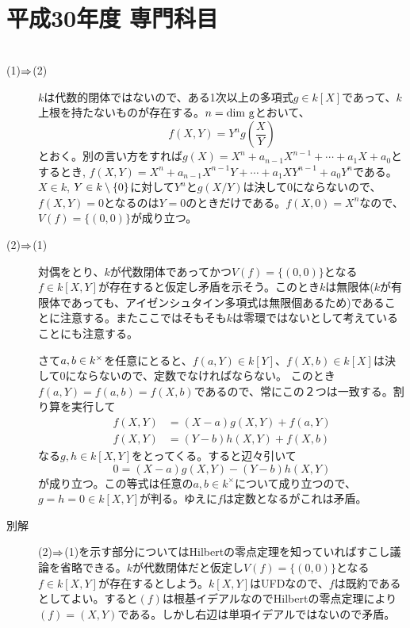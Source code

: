 \section{平成30年度 専門科目}

\subsubsection{} %
\begin{sol}${}$
\begin{description}
  \item[(1)$\Rightarrow$(2)] $k$は代数的閉体ではないので、ある1次以上の多項式$g \in k[X]$であって、$k$上根を持たないものが存在する。$n = \rm{dim}\ g$とおいて、
  \[
  f(X,Y)= Y^n g \left(\frac{X}{Y} \right)
  \]
  とおく。別の言い方をすれば$g(X)= X^n + a_{n-1}X^{n-1} + \cdots + a_1X + a_0$とするとき, $f(X,Y)= X^n + a_{n-1}X^{n-1}Y + \cdots + a_1XY^{n-1} + a_0Y^n$である。$X \in k$, $Y \in k \setminus \{0\}$に対して$Y^n$と$g(X/Y)$は決して0にならないので、$f(X,Y)=0$となるのは$Y=0$のときだけである。$f(X,0)=X^n$なので、
  $V(f) =\{ (0,0)\}$が成り立つ。
  \item[(2)$\Rightarrow$(1)] 対偶をとり、$k$が代数閉体であってかつ$V(f) =\{ (0,0)\}$となる$f \in k[X,Y]$が存在すると仮定し矛盾を示そう。このとき$k$は無限体($k$が有限体であっても、アイゼンシュタイン多項式は無限個あるため)であることに注意する。またここではそもそも$k$は零環ではないとして考えていることにも注意する。

  さて$a,b \in k^{\times}$を任意にとると、$f(a,Y) \in k[Y]$、$f(X,b) \in k[X]$は決して0にならないので、定数でなければならない。
  このとき$f(a,Y)=f(a,b)=f(X,b)$であるので、常にこの２つは一致する。割り算を実行して
  \begin{align*}
    f(X,Y) &= (X-a)g(X,Y) + f(a,Y) \\
    f(X,Y) & =(Y-b)h(X,Y)+f(X,b)
  \end{align*}
  なる$g, h \in k[X,Y]$をとってくる。すると辺々引いて
  \[
  0 = (X-a)g(X,Y) - (Y-b)h(X,Y)
  \]
  が成り立つ。この等式は任意の$a,b \in k^{\times}$について成り立つので、$g=h=0 \in k[X,Y]$が判る。ゆえに$f$は定数となるがこれは矛盾。
  \item[別解] (2)$\Rightarrow$(1)を示す部分についてはHilbertの零点定理を知っていればすこし議論を省略できる。$k$が代数閉体だと仮定し$V(f) =\{ (0,0)\}$となる$f \in k[X,Y]$が存在するとしよう。$k[X,Y]$はUFDなので、$f$は既約であるとしてよい。すると$(f)$は根基イデアルなのでHilbertの零点定理により$(f) = (X,Y)$である。しかし右辺は単項イデアルではないので矛盾。
\end{description}
\end{sol}


